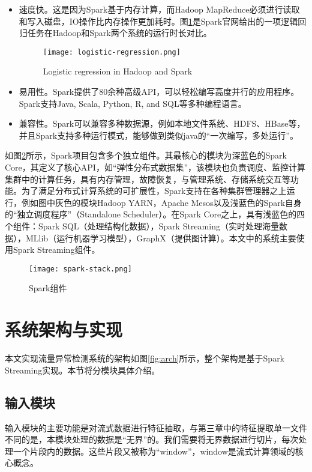 \begin{itemize}
  \item 速度快。这是因为Spark基于内存计算，而Hadoop MapReduce必须进行读取和写入磁盘，IO操作比内存操作更加耗时。图\ref{fig:Logistic regression in Hadoop and Spark}是Spark官网给出的一项逻辑回归任务在Hadoop和Spark两个系统的运行时长对比。
   \begin{figure}
    \centering
    \texttt{[image: logistic-regression.png]}
    \caption{Logistic regression in Hadoop and Spark}
    \label{fig:Logistic regression in Hadoop and Spark}
  \end{figure}
  \item 易用性。Spark提供了80余种高级API，可以轻松编写高度并行的应用程序。Spark支持Java, Scala, Python, R, and SQL等多种编程语言。
  \item 兼容性。Spark可以兼容多种数据源，例如本地文件系统、HDFS、HBase等，并且Spark支持多种运行模式，能够做到类似java的“一次编写，多处运行”。
\end{itemize}



如图\ref{fig:Spark组件}所示，Spark项目包含多个独立组件。其最核心的模块为深蓝色的Spark Core，其定义了核心API，如“弹性分布式数据集”，该模块也负责调度、监控计算集群中的计算任务，具有内存管理，故障恢复，与管理系统、存储系统交互等功能。为了满足分布式计算系统的可扩展性，Spark支持在各种集群管理器之上运行，例如图中灰色的模块Hadoop YARN，Apache Mesos以及浅蓝色的Spark自身的“独立调度程序”（Standalone Scheduler）。在Spark Core之上，具有浅蓝色的四个组件：Spark SQL（处理结构化数据），Spark Streaming（实时处理海量数据），MLlib（运行机器学习模型），GraphX（提供图计算）。本文中的系统主要使用Spark Streaming组件。



\begin{figure}
  \centering
  \texttt{[image: spark-stack.png]}
  \caption{Spark组件}
  \label{fig:Spark组件}
\end{figure}



\section{系统架构与实现}
本文实现流量异常检测系统的架构如图\ref{fig:arch}所示，整个架构是基于Spark Streaming实现。本节将分模块具体介绍。
\subsection{输入模块}
输入模块的主要功能是对流式数据进行特征抽取，与第三章中的特征提取单一文件不同的是，本模块处理的数据是“无界”的。我们需要将无界数据进行切片，每次处理一个片段内的数据。这些片段又被称为“window”，window是流式计算领域的核心概念。


